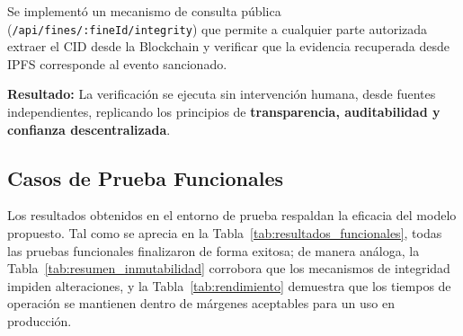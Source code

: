 Se implementó un mecanismo de consulta pública (\texttt{/api/fines/:fineId/integrity}) que permite a cualquier parte autorizada extraer el CID desde la Blockchain y verificar que la evidencia recuperada desde IPFS corresponde al evento sancionado.

\textbf{Resultado:} La verificación se ejecuta sin intervención humana, desde fuentes independientes, replicando los principios de \textbf{transparencia, auditabilidad y confianza descentralizada}.

\subsection{Casos de Prueba Funcionales}



Los resultados obtenidos en el entorno de prueba respaldan la eficacia del modelo propuesto. Tal como se aprecia en la Tabla~\ref{tab:resultados_funcionales}, todas las pruebas funcionales finalizaron de forma exitosa; de manera análoga, la Tabla~\ref{tab:resumen_inmutabilidad} corrobora que los mecanismos de integridad impiden alteraciones, y la Tabla~\ref{tab:rendimiento} demuestra que los tiempos de operación se mantienen dentro de márgenes aceptables para un uso en producción. 
